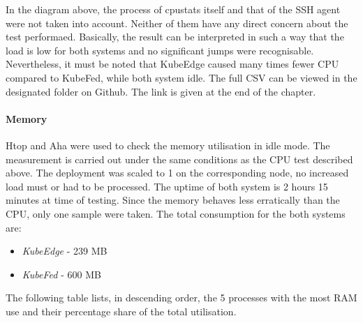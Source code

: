 \documentclass[MSC,Master,english]{twbook}%
\begin{document}
In the diagram above, the process of cpustats itself and that of the SSH agent were not taken into account. Neither of them have any direct concern about the test performaed. Basically, the result can be interpreted in such a way that the load is low for both systems and no significant jumps were recognisable. Nevertheless, it must be noted that KubeEdge caused many times fewer CPU compared to KubeFed, while both system idle. The full CSV can be viewed in the designated folder on Github. The link is given at the end of the chapter.

\paragraph{Memory} Htop\cite{htop} and \ac{Aha}\cite{aha} were used to check the memory utilisation in idle mode. The measurement is carried out under the same conditions as the CPU test described above. The deployment was scaled to 1 on the corresponding node, no increased load must or had to be processed. The uptime of both system is 2 hours 15 minutes at time of testing. Since the memory behaves less erratically than the CPU, only one sample were taken. The total consumption for the both systems are:

\begin{itemize}
    \itemsep0em 
    \item \textit{KubeEdge} - 239 MB
    \item \textit{KubeFed} - 600 MB
\end{itemize}

The following table lists, in descending order, the 5 processes with the most RAM use and their percentage share of the total utilisation.
\end{document}
